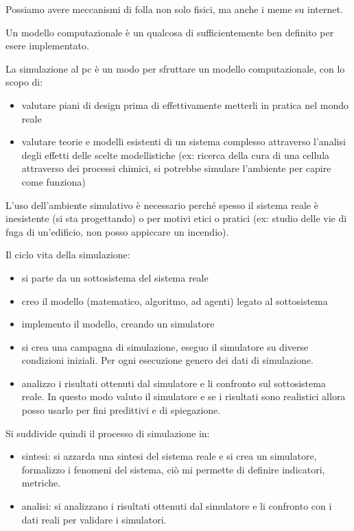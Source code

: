 Possiamo avere meccanismi di folla non solo fisici, ma anche i meme su internet.

\begin{definizione}
    Un modello computazionale è un qualcosa di sufficientemente ben definito per esere 
    implementato.
\end{definizione}

\begin{definizione}
    La simulazione al pc è un modo per sfruttare un modello computazionale, con lo 
    scopo di:
    \begin{itemize}
        \item valutare piani di design prima di effettivamente metterli in pratica 
        nel mondo reale
        \item valutare teorie e modelli esistenti di un sistema complesso attraverso l'analisi
        degli effetti delle scelte modellistiche (ex: ricerca della cura di una cellula
        attraverso dei processi chimici, si potrebbe simulare l'ambiente per capire 
        come funziona)
    \end{itemize}
\end{definizione}
L'uso dell'ambiente simulativo è necessario perché spesso il sistema reale è inesistente
 (si sta progettando) o per motivi etici o pratici (ex: studio delle vie di fuga 
 di un'edificio, non posso appiccare un incendio).

Il ciclo vita della simulazione:
\begin{itemize}
    \item si parte da un sottosistema del sistema reale
    \item creo il modello (matematico, algoritmo, ad agenti) legato al sottosistema
    \item implemento il modello, creando un simulatore
    \item si crea una campagna di simulazione, eseguo il simulatore su diverse 
    condizioni iniziali. Per ogni esecuzione genero dei dati di simulazione.
    \item analizzo i risultati ottenuti dal simulatore e li confronto sul sottosistema
    reale. In questo modo valuto il simulatore e se i risultati sono realistici 
    allora posso usarlo per fini predittivi e di spiegazione.
\end{itemize}

Si suddivide quindi il processo di simulazione in:
\begin{itemize}
    \item sintesi: si azzarda una sintesi del sistema reale e si crea un simulatore,
    formalizzo i fenomeni del sistema, ciò mi permette di definire indicatori, metriche. 
    \item analisi: si analizzano i risultati ottenuti dal simulatore e li confronto 
    con i dati reali per validare i simulatori.
\end{itemize}

